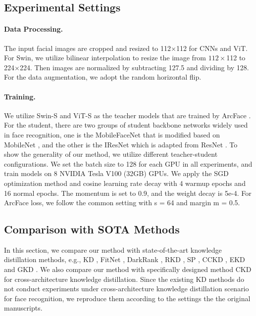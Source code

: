 \documentclass[sigconf]{acmart}
\begin{document}
\subsection{Experimental Settings}
\paragraph{Data Processing.} The input facial images are cropped and resized to 112$\times$112 for CNNs and ViT. For Swin, we utilize bilinear interpolation to resize the image from $112\times$112 to 224$\times$224. Then images are normalized by subtracting 127.5 and dividing by 128. For the data augmentation, we adopt the random horizontal flip.
\paragraph{Training.} We utilize Swin-S and ViT-S as the teacher models that are trained by ArcFace \cite{arcface}. For the student, there are two groups of student backbone networks widely used in face recognition, one is the MobileFaceNet \cite{mobilefacenet} that is modified based on MobileNet \cite{mobilenetv3}, and the other is the IResNet \cite{arcface} which is adapted from ResNet \cite{resnet}. To show the generality of our method, we utilize different teacher-student configurations. We set the batch size to 128 for each GPU in all experiments, and train models on 8 NVIDIA Tesla V100 (32GB) GPUs. We apply the SGD optimization method and cosine learning rate decay \cite{deit} with 4 warmup epochs and 16 normal epochs. The momentum is set to 0.9, and the weight decay is 5e-4. For ArcFace loss, we follow the common setting with s = 64 and margin m = 0.5. 
\subsection{Comparison with SOTA Methods}
In this section, we compare our method with state-of-the-art knowledge distillation methods, e.g., KD \cite{kd}, FitNet \cite{fitnet}, DarkRank \cite{darkrank}, RKD \cite{rkd}, SP \cite{ekd}, CCKD \cite{cckd}, EKD \cite{ekd} and GKD \cite{gkd}. We also compare our method with specifically designed method CKD \cite{accv} for cross-architecture knowledge distillation. Since the existing KD methods do not conduct experiments under cross-architecture knowledge distillation scenario for face recognition, we reproduce them according to the settings the the original manuscripts. %
\end{document}
